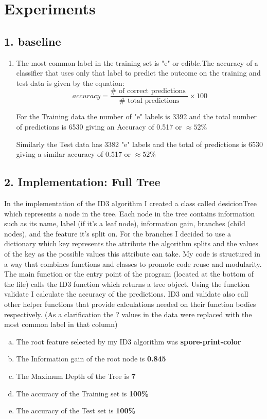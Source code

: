 \documentclass[11pt]{article}
\begin{document}
\section{Experiments}

\subsection*{1. baseline}
	\begin{enumerate}
		\item The most common label in the training set is "e" or edible.The accuracy of a classifier that uses only that label to predict the outcome on the training and test data is given by the equation:
		$$ accuracy = \frac{\# \text{ of correct predictions }}{\# \text{ total predictions}}  \times 100$$
		
		For the Training data the number of "e" labels  is 3392 and the total number of predictions is 6530 giving an Accuracy of 0.517 or $\approx 52\%$
		
		Similarly the Test data has 3382 "e" labels and the total of predictions is 6530 giving a similar accuracy of 0.517 or $\approx 52\%$
	\end{enumerate}
\subsection*{2. Implementation: Full Tree}
	In the implementation of the ID3 algorithm I created a class called desicionTree which represents a node in the tree. Each node in the tree contains information such as its name, label (if it's a leaf node), information gain, branches (child nodes), and the feature it's split on. For the branches I decided to use a dictionary which key represents the attribute the algorithm splits and the values of the key as the possible values this attribute can take.
	My code is structured in a way that combines functions and classes to promote code reuse and modularity. The  main function or the entry point of the program (located at the bottom of the file) calls the ID3 function which returns a tree object. Using the function validate I calculate the accuracy of the predictions.
	ID3 and validate also call other helper functions that provide calculations needed on their function bodies respectively.
	(As a clarification the ? values in the data were replaced with the most common label in that column)
	\begin{enumerate}[(a)]
		
		\item The root feature selected by my ID3 algorithm was \textbf{spore-print-color}
		\item The Information gain of the root node is \textbf{0.845} 
		\item  The Maximum Depth of the Tree is \textbf{7}
		\item The accuracy of the Training set is \textbf{100\%}
		\item The accuracy of the Test set is \textbf{100\%}
	\end{enumerate}
\end{document}
